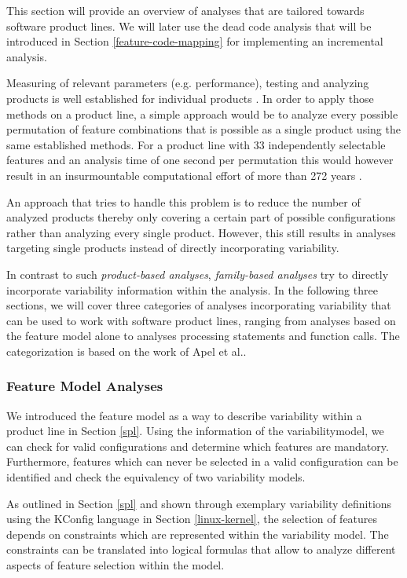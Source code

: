 \documentclass[a4paper]{article}
\begin{document}
This section will provide an overview of analyses that are tailored towards software product lines. We will later use the dead code analysis that will be introduced in Section \ref{feature-code-mapping}  for implementing an incremental analysis.

Measuring of relevant parameters (e.g. performance), testing and analyzing products is well established for individual products \cite[p.243]{Apel:2013:FSP:2541773}. 
In order to apply those methods on a product line, a simple approach would be to analyze every possible permutation of feature combinations that is possible as a single product using the same established methods. For a product line with 33 independently selectable features and an analysis time of one second per permutation this would however result in an insurmountable computational effort of more than 272 years \cite{Thum:2014:CSA:2620784.2580950}. 

An approach that tries to handle this problem is to reduce the number of analyzed products thereby only covering a certain part of possible configurations rather than analyzing every single product. However, this still results in analyses targeting single products instead of directly incorporating variability. 

In contrast to such \emph{product-based analyses}, \emph{family-based analyses} try to directly incorporate variability information within the analysis. In the following three sections, we will cover three categories of analyses incorporating variability that can be used to work with software product lines, ranging from analyses based on the feature model alone  to analyses processing statements and function calls. The categorization is based on the work of Apel et al.\cite{Apel:2013:FSP:2541773}.

\subsubsection{Feature Model Analyses}

We introduced the feature model as a way to describe variability within a product line in Section \ref{spl}. Using the information of the variabilitymodel, we can check for valid configurations and determine which features are mandatory.
Furthermore, features which can never be selected in a valid configuration can be identified and check the equivalency of two variability models.

As outlined in Section \ref{spl} and shown through exemplary variability definitions using the KConfig language in Section \ref{linux-kernel}, the selection of features depends on constraints which are represented within the variability model. The constraints can be translated into logical formulas that allow to analyze different aspects of feature selection within the model.
\end{document}
